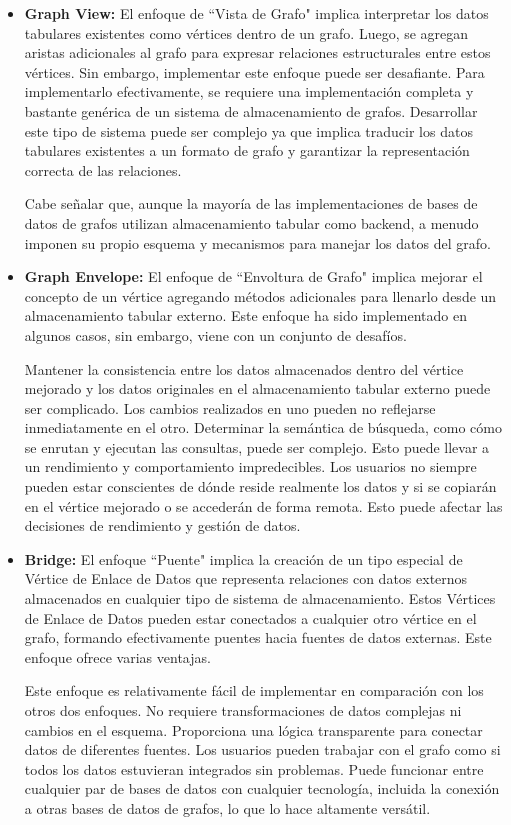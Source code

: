 \documentclass[pdflatex,sn-mathphys-num]{sn-jnl}
\theoremstyle{thmstyleone}%
\theoremstyle{thmstyletwo}%
\theoremstyle{thmstylethree}%
\begin{document}
\begin{itemize}
    \item \textbf{Graph View:} El enfoque de ``Vista de Grafo" implica interpretar los datos tabulares existentes como vértices dentro de un grafo. Luego, se agregan aristas adicionales al grafo para expresar relaciones estructurales entre estos vértices. Sin embargo, implementar este enfoque puede ser desafiante. Para implementarlo efectivamente, se requiere una implementación completa y bastante genérica de un sistema de almacenamiento de grafos. Desarrollar este tipo de sistema puede ser complejo ya que implica traducir los datos tabulares existentes a un formato de grafo y garantizar la representación correcta de las relaciones.
    
    Cabe señalar que, aunque la mayoría de las implementaciones de bases de datos de grafos utilizan almacenamiento tabular como backend, a menudo imponen su propio esquema y mecanismos para manejar los datos del grafo.

    \item \textbf{Graph Envelope:} El enfoque de ``Envoltura de Grafo" implica mejorar el concepto de un vértice agregando métodos adicionales para llenarlo desde un almacenamiento tabular externo. Este enfoque ha sido implementado en algunos casos, sin embargo, viene con un conjunto de desafíos.
    
    Mantener la consistencia entre los datos almacenados dentro del vértice mejorado y los datos originales en el almacenamiento tabular externo puede ser complicado. Los cambios realizados en uno pueden no reflejarse inmediatamente en el otro. Determinar la semántica de búsqueda, como cómo se enrutan y ejecutan las consultas, puede ser complejo. Esto puede llevar a un rendimiento y comportamiento impredecibles. Los usuarios no siempre pueden estar conscientes de dónde reside realmente los datos y si se copiarán en el vértice mejorado o se accederán de forma remota. Esto puede afectar las decisiones de rendimiento y gestión de datos.
    
    \item \textbf{Bridge:} El enfoque ``Puente" implica la creación de un tipo especial de Vértice de Enlace de Datos que representa relaciones con datos externos almacenados en cualquier tipo de sistema de almacenamiento. Estos Vértices de Enlace de Datos pueden estar conectados a cualquier otro vértice en el grafo, formando efectivamente puentes hacia fuentes de datos externas. Este enfoque ofrece varias ventajas.
    
    Este enfoque es relativamente fácil de implementar en comparación con los otros dos enfoques. No requiere transformaciones de datos complejas ni cambios en el esquema. Proporciona una lógica transparente para conectar datos de diferentes fuentes. Los usuarios pueden trabajar con el grafo como si todos los datos estuvieran integrados sin problemas. Puede funcionar entre cualquier par de bases de datos con cualquier tecnología, incluida la conexión a otras bases de datos de grafos, lo que lo hace altamente versátil.

\end{itemize}
\end{document}
